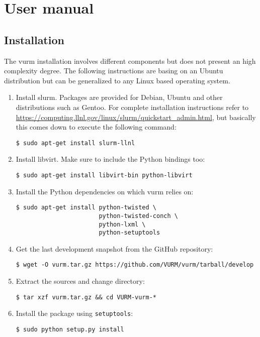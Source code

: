 \chapter{User manual}
\label{apx:user-manual}
\section{Installation}

The \gls{vurm} installation involves different components but does not present an high complexity degree. The following instructions are basing on an Ubuntu distribution but can be generalized to any Linux based operating system.

\begin{enumerate}
	\item Install \gls{slurm}. Packages are provided for Debian, Ubuntu and other distributions such as Gentoo. For complete installation instructions refer to \url{https://computing.llnl.gov/linux/slurm/quickstart_admin.html}, but basically this comes down to execute the following command:
	
	\begin{lstlisting}
$ sudo apt-get install slurm-llnl
	\end{lstlisting}
	
	\item Install libvirt. Make sure to include the Python bindings too:
	
	\begin{lstlisting}
$ sudo apt-get install libvirt-bin python-libvirt
	\end{lstlisting}
	
	\item Install the Python dependencies on which \gls{vurm} relies on:
	
	\begin{lstlisting}
$ sudo apt-get install python-twisted \
                       python-twisted-conch \
                       python-lxml \
                       python-setuptools
	\end{lstlisting}
	
	\item Get the last development snapshot from the GitHub repository:
	
	\begin{lstlisting}
$ wget -O vurm.tar.gz https://github.com/VURM/vurm/tarball/develop
	\end{lstlisting}
	
	\item Extract the sources and change directory:
	
	\begin{lstlisting}
$ tar xzf vurm.tar.gz && cd VURM-vurm-*
	\end{lstlisting}
	
	\item Install the package using \texttt{setuptools}:
	\begin{lstlisting}
$ sudo python setup.py install
	\end{lstlisting}
	
\end{enumerate}

